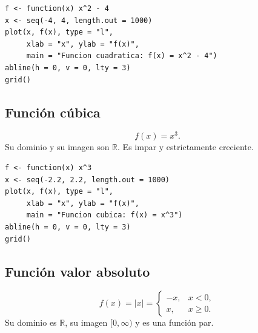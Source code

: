 \documentclass[12pt]{article}
\theoremstyle{remark}
\newcommand{\R}{\mathbb{R}}
\begin{document}
\begin{verbatim}
f <- function(x) x^2 - 4
x <- seq(-4, 4, length.out = 1000)
plot(x, f(x), type = "l",
     xlab = "x", ylab = "f(x)",
     main = "Funcion cuadratica: f(x) = x^2 - 4")
abline(h = 0, v = 0, lty = 3)
grid()
\end{verbatim}

\subsection{Función cúbica}

\[
f(x)=x^3.
\]
Su dominio y su imagen son $\R$. Es impar y estrictamente creciente.

\begin{center}
\end{center}

\begin{verbatim}
f <- function(x) x^3
x <- seq(-2.2, 2.2, length.out = 1000)
plot(x, f(x), type = "l",
     xlab = "x", ylab = "f(x)",
     main = "Funcion cubica: f(x) = x^3")
abline(h = 0, v = 0, lty = 3)
grid()
\end{verbatim}

\subsection{Función valor absoluto}

\[
f(x)=|x|=
\begin{cases}
-x,&x<0,\\
x,&x\geq0.
\end{cases}
\]
Su dominio es $\R$, su imagen $[0,\infty)$ y es una función par.

\begin{center}
\end{center}
\end{document}
